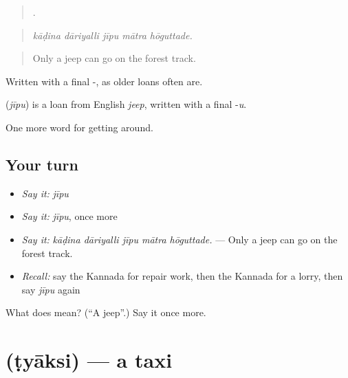 \begin{quote}
    .
\end{quote}

\begin{quote}
\emph{kāḍina dāriyalli jīpu mātra hōguttade.}
\end{quote}

\begin{quote}
Only a jeep can go on the forest track.
\end{quote}

Written with a final -, as older loans often are.

\begin{cousinweb}
\textbf{} (\emph{jīpu}) is a loan from English \emph{jeep}, written with a final -\emph{u}.
\end{cousinweb}

\begin{grammarlens}[title={What you've built}]
One more word for getting around.
\end{grammarlens}

\subsection*{Your turn}
\begin{itemize}
\raggedright
  \item \emph{Say it:} \emph{jīpu}
  \item \emph{Say it:} \emph{jīpu}, once more
  \item \emph{Say it:} \emph{kāḍina dāriyalli jīpu mātra hōguttade.} — Only a jeep can go on the forest track.
  \item \emph{Recall:} say the Kannada for repair work, then the Kannada for a lorry, then say \emph{jīpu} again
\end{itemize}

\begin{tcolorbox}[breakable,colback=teal!4,colframe=teal!35!black,title={Before you move on}]
What does  mean? (\textquotedblleft{}A jeep\textquotedblright{}.) Say it once more.
\end{tcolorbox}
\section[\texorpdfstring{\kn{ಟ್ಯಾಕ್ಸಿ} (ṭyāksi)}{ಟ್ಯಾಕ್ಸಿ (ṭyāksi)}]{ (ṭyāksi) — a taxi}

\label{lesson:KA-C451-tyaksi}



